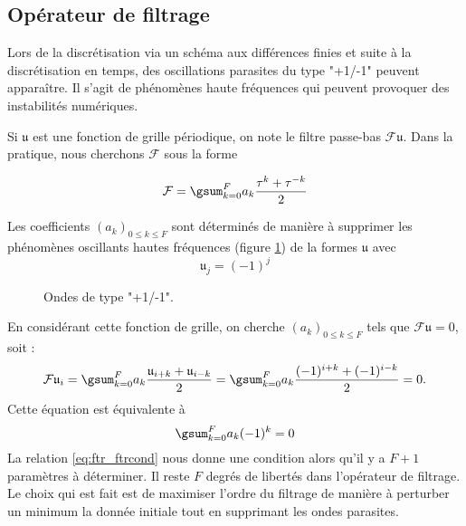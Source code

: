 \subsection{Opérateur de filtrage}


Lors de la discrétisation via un schéma aux différences finies et suite à la discrétisation en temps, des oscillations parasites du type "+1/-1" peuvent apparaître. Il s'agit de phénomènes haute fréquences qui peuvent provoquer des instabilités numériques. 

Si $\mathfrak{u}$ est une fonction de grille périodique, on note le filtre passe-bas $\mathcal{F}\mathfrak{u}$. Dans la pratique, nous cherchons $\mathcal{F}$ sous la forme 

\begin{equation}
\mathcal{F} = \gsum_{k=0}^F a_k \dfrac{\tau^k + \tau^{-k}}{2}
\label{eq:ftr}
\end{equation}

Les coefficients $(a_k)_{0 \leq k \leq F}$ sont déterminés de manière à supprimer les phénomènes oscillants hautes fréquences (figure \ref{fig:hf_waves}) de la formes $\mathfrak{u}$ avec 
\begin{equation}
\mathfrak{u}_j = (-1)^j
\end{equation}

\begin{figure}[htbp]
\begin{center}
\end{center}
\caption{Ondes de type "+1/-1".}
\label{fig:hf_waves}
\end{figure}


En considérant cette fonction de grille, on cherche $(a_k)_{0\leq k \leq F}$ tels que $\mathcal{F} \mathfrak{u} = \mathfrak{0}$, soit :
\begin{equation}
\mathcal{F}\mathfrak{u}_i = \gsum_{k=0}^F a_k \dfrac{\mathfrak{u}_{i+k} + \mathfrak{u}_{i-k}}{2} = \gsum_{k=0}^F a_k  \dfrac{(-1)^{i+k} + (-1)^{i-k}}{2} = 0.
\end{equation}
Cette équation est équivalente à 
\begin{equation}
\gsum_{k=0}^F a_k (-1)^k = 0
\label{eq:ftr_ftrcond}
\end{equation}
La relation \eqref{eq:ftr_ftrcond} nous donne une condition alors qu'il y a $F+1$ paramètres à déterminer. Il reste $F$ degrés de libertés dans l'opérateur de filtrage. Le choix qui est fait est de maximiser l'ordre du filtrage de manière à perturber un minimum la donnée initiale tout en supprimant les ondes parasites.

